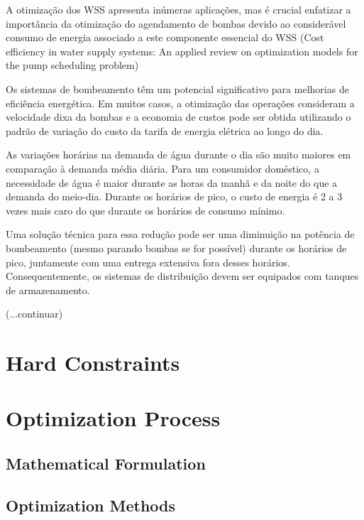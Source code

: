 A otimização dos WSS apresenta inúmeras aplicações, mas é crucial enfatizar a importância da otimização do agendamento de bombas devido ao considerável consumo de energia associado a este componente essencial do WSS (Cost efficiency in water supply systems: An applied review on optimization models for the pump scheduling problem)

Os sistemas de bombeamento têm um potencial significativo para melhorias de eficiência energética. Em muitos casos, a otimização das operações consideram a velocidade dixa da bombas e a economia de custos pode ser obtida utilizando o padrão de variação do custo da tarifa de energia elétrica ao longo do dia.\cite{rfc8}

As variações horárias na demanda de água durante o dia são muito maiores em comparação à demanda média diária. Para um consumidor doméstico, a necessidade de água é maior durante as horas da manhã e da noite do que a demanda do meio-dia. Durante os horários de pico, o custo de energia é 2 a 3 vezes mais caro do que durante os horários de consumo mínimo.

Uma solução técnica para essa redução pode ser uma diminuição na potência de bombeamento (mesmo parando bombas se for possível) durante os horários de pico, juntamente com uma entrega extensiva fora desses horários. Consequentemente, os sistemas de distribuição devem ser equipados com tanques de armazenamento.


(...continuar)

\section{Hard Constraints}

\section{Optimization Process}

\subsection{Mathematical Formulation}

\subsection{Optimization Methods}

